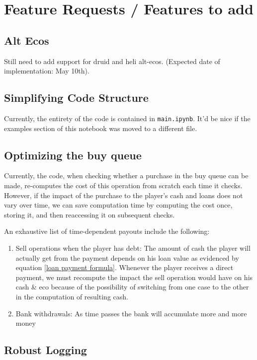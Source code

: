 \documentclass[12pt,letterpaper]{article}
\theoremstyle{remark}
\theoremstyle{plain}
\begin{document}
\section{Feature Requests / Features to add}

\subsection{Alt Ecos}

Still need to add support for druid and heli alt-ecos. (Expected date of implementation: May 10th).

\subsection{Simplifying Code Structure}

Currently, the entirety of the code is contained in \texttt{main.ipynb}. It'd be nice if the examples section of this notebook was moved to a different file.

\subsection{Optimizing the buy queue}

Currently, the code, when checking whether a purchase in the buy queue can be made, re-computes the cost of this operation from scratch each time it checks. However, if the impact of the purchase to the player's cash and loans does not vary over time, we can save computation time by computing the cost once, storing it, and then reaccessing it on subsequent checks.

An exhaustive list of time-dependent payouts include the following:
\begin{enumerate}
    \item Sell operations when the player has debt: The amount of cash the player will actually get from the payment depends on his loan value as evidenced by equation \ref{loan payment formula}. Whenever the player receives a direct payment, we must recompute the impact the sell operation would have on his cash \& eco because of the possibility of switching from one case to the other in the computation of resulting cash.
    \item Bank withdrawals: As time passes the bank will accumulate more and more money
\end{enumerate}

\subsection{Robust Logging}
\end{document}
